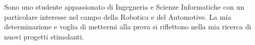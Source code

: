 

\begin{cvparagraph}

Sono uno studente appassionato di Ingegneria e Scienze Informatiche con un particolare interesse nel campo della Robotica e del Automotive. La mia determinazione e voglia di mettermi alla prova si riflettono nella mia ricerca di nuovi progetti stimolanti.

\end{cvparagraph}